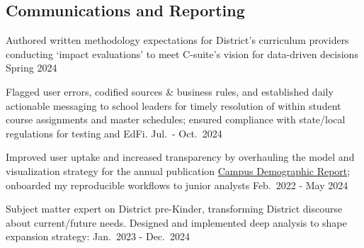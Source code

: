 \documentclass[
  11pt,
]
{article}
\renewenvironment{itemize}{
  \begin{list}{}{
    \setlength{\leftmargin}{1.5em}
  }
}{
  \end{list}
}
\begin{document}
\subsection{\texorpdfstring{\textbf{Communications and
Reporting}}{Communications and Reporting}}\label{communications-and-reporting}

\begin{itemize}
\item
  Authored written methodology expectations for District's curriculum
  providers conducting `impact evaluations' to meet C-suite's vision for
  data-driven decisions \hfill Spring 2024
\item
  Flagged user errors, codified sources \& business rules, and
  established daily actionable messaging to school leaders for timely
  resolution of within student course assignments and master schedules;
  ensured compliance with state/local regulations for testing and EdFi.
  \hfill Jul.~- Oct.~2024
\item
  Improved user uptake and increased transparency by overhauling the
  model and visualization strategy for the annual publication
  \href{https://tx01001591.schoolwires.net/site/handlers/filedownload.ashx?moduleinstanceid=392028&dataid=424429&FileName=Campus\%20Demographic\%20Report\%202021-2022.pdf}{Campus
  Demographic Report}; onboarded my reproducible workflows to junior
  analysts \hfill Feb.~2022 - May 2024
\end{itemize}

Subject matter expert on District pre-Kinder, transforming District
discourse about current/future needs. Designed and implemented deep
analysis to shape expansion strategy: \hfill Jan.~2023 - Dec.~2024
\end{document}

